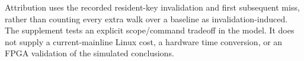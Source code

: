 Attribution uses the recorded resident-key invalidation and first subsequent miss, rather than counting every extra walk over a baseline as invalidation-induced. The supplement tests an explicit scope/command tradeoff in the model. It does not supply a current-mainline Linux cost, a hardware time conversion, or an FPGA validation of the simulated conclusions.
